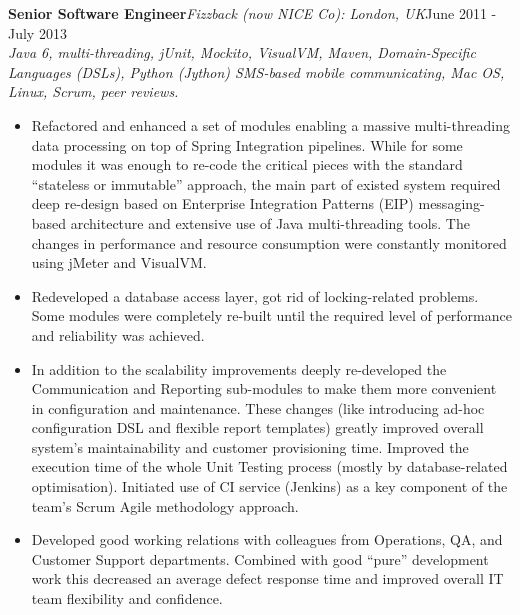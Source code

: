 \documentclass{res}
\newcommand{\jobdes}[4]{\needspace{3\baselineskip} %
{\noindent \bf #3\hspace{2ex}}{{\em \small #1}}{\hfill #2}\\{{\it \small #4.}}}
\begin{document}
\begin{resume}
\jobdes{Fizzback (now NICE Co): London, UK} {June 2011 - July 2013}{Senior Software Engineer}
{Java 6, multi-threading, jUnit, Mockito, VisualVM, Maven, Domain-Specific Languages (DSLs), Python (Jython) SMS-based mobile communicating, Mac OS, Linux, Scrum, peer reviews}
\begin{itemize} \itemsep -2pt %
 \item Refactored and enhanced a set of modules enabling a massive multi-threading data processing on top of Spring Integration pipelines.
While for some modules it was enough to re-code the critical pieces with the standard “stateless or immutable” approach, the main part of existed system required deep re-design based on Enterprise Integration Patterns (EIP) messaging-based architecture and extensive use of Java multi-threading tools. The changes in performance and resource consumption were constantly monitored using jMeter and VisualVM.
 \item Redeveloped a database access layer, got rid of locking-related problems. Some modules were completely re-built until the required level of performance and reliability was achieved.
 \item In addition to the scalability improvements deeply re-developed the Communication and Reporting sub-modules to make them more convenient in configuration and maintenance. These changes (like introducing ad-hoc configuration DSL and flexible report templates) greatly improved overall system's maintainability and customer provisioning time.
Improved the execution time of the whole Unit Testing process (mostly by database-related optimisation). Initiated use of CI service (Jenkins) as a key component of the team’s Scrum Agile methodology approach.
 \item Developed good working relations with colleagues from Operations, QA, and Customer Support departments. Combined with good ``pure'' development work this decreased an average defect response time and improved overall IT team flexibility and confidence.
\end{itemize}


\end{resume}
\end{document}
